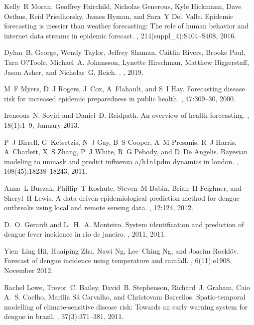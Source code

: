 \documentclass[a4paper]{article}
\begin{document}
\begin{thebibliography}{100}
Kelly~R Moran, Geoffrey Fairchild, Nicholas Generous, Kyle Hickmann, Dave
  Osthus, Reid Priedhorsky, James Hyman, and Sara~Y Del~Valle.
\newblock Epidemic forecasting is messier than weather forecasting: The role of
  human behavior and internet data streams in epidemic forecast.
, 214(suppl\_4):S404--S408,
  2016.

Dylan~B. George, Wendy Taylor, Jeffrey Shaman, Caitlin Rivers, Brooke Paul,
  Tara O?Toole, Michael~A. Johansson, Lynette Hirschman, Matthew Biggerstaff,
  Jason Asher, and Nicholas~G. Reich.
.
, 2019.

M~F Myers, D~J Rogers, J~Cox, A~Flahault, and S~I Hay.
\newblock Forecasting disease risk for increased epidemic preparedness in
  public health.
, 47:309--30, 2000.

Ireneous~N. Soyiri and Daniel~D. Reidpath.
\newblock An overview of health forecasting.
, 18(1):1--9,
  January 2013.

P~J Birrell, G~Ketsetzis, N~J Gay, B~S Cooper, A~M Presanis, R~J Harris,
  A~Charlett, X~S Zhang, P~J White, R~G Pebody, and D~{De Angelis}.
\newblock Bayesian modeling to unmask and predict influenza a/h1n1pdm dynamics
  in london.
, 108(45):18238--18243, 2011.

Anna~L Buczak, Phillip~T Koshute, Steven~M Babin, Brian~H Feighner, and
  Sheryl~H Lewis.
\newblock A data-driven epidemiological prediction method for dengue outbreaks
  using local and remote sensing data.
, 12:124, 2012.

D.~O. Gerardi and L.~H.~A. Monteiro.
\newblock System identification and prediction of dengue fever incidence in rio
  de janeiro.
, 2011, 2011.

Yien~Ling Hii, Huaiping Zhu, Nawi Ng, Lee~Ching Ng, and Joacim Rockl{\"{o}}v.
\newblock Forecast of dengue incidence using temperature and rainfall.
, 6(11):e1908, November 2012.

Rachel Lowe, Trevor~C. Bailey, David~B. Stephenson, Richard~J. Graham, Caio
  A.~S. Coelho, Marilia {S{\'{a}} Carvalho}, and Christovam Barcellos.
\newblock Spatio-temporal modelling of climate-sensitive disease risk: Towards
  an early warning system for dengue in brazil.
, 37(3):371--381, 2011.


\end{thebibliography}
\end{document}
